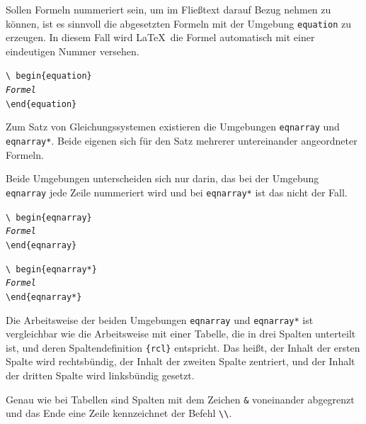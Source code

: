 \documentclass[a4paper,10pt,twoside]{scrbook}
\begin{document}
{Sollen Formeln nummeriert sein, um im Fließtext darauf Bezug nehmen zu können, 
ist es sinnvoll die abgesetzten Formeln mit der Umgebung
\verb!equation! zu erzeugen. In diesem Fall wird \LaTeX\ die Formel automatisch mit einer 
eindeutigen Nummer versehen.


\begin{boxedminipage}{\textwidth}
\texttt{\textbackslash
begin\{equation\} \\
\textsl{Formel} \\
\textbackslash end\{equation\}}
\end{boxedminipage}


Zum Satz von Gleichungssystemen 
existieren die Umgebungen \verb!eqnarray! und \verb!eqnarray*!.
Beide eigenen sich für den Satz mehrerer  untereinander angeordneter Formeln.

Beide Umgebungen unterscheiden sich nur darin, das bei der Umgebung \verb!eqnarray!
jede Zeile nummeriert wird und bei \verb!eqnarray*! ist das nicht der Fall.

\begin{boxedminipage}{\textwidth}
\texttt{\textbackslash
begin\{eqnarray\} \\
\textsl{Formel} \\
\textbackslash end\{eqnarray\}}
\end{boxedminipage}

\begin{boxedminipage}{\textwidth}
\texttt{\textbackslash
begin\{eqnarray*\} \\
\textsl{Formel} \\
\textbackslash end\{eqnarray*\}}
\end{boxedminipage}


Die Arbeitsweise der beiden Umgebungen 
\verb!eqnarray! und 
\verb!eqnarray*!
ist vergleichbar wie die Arbeitsweise mit einer Tabelle, die in drei Spalten
unterteilt ist, und deren 
Spaltendefinition \verb!{rcl}! entspricht. 
Das heißt, der Inhalt der ersten Spalte wird rechtsbündig, der Inhalt der 
zweiten Spalte zentriert, und der Inhalt der dritten Spalte wird linksbündig gesetzt. 

Genau wie bei Tabellen sind Spalten mit dem Zeichen \verb!&! voneinander abgegrenzt
und das Ende eine Zeile kennzeichnet der Befehl \verb!\\!.

}
\end{document}
